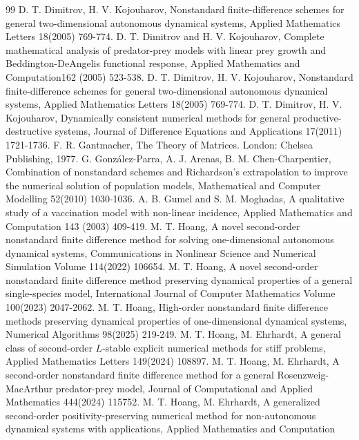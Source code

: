 \documentclass[12pt]{article}
\theoremstyle{definition}
\theoremstyle{remark}
\numberwithin{equation}{section}
\begin{document}
\begin{thebibliography}{99}
D. T. Dimitrov, H. V. Kojouharov, Nonstandard finite-difference schemes for general two-dimensional autonomous dynamical systems, Applied Mathematics Letters 18(2005) 769-774.
D. T. Dimitrov and H. V. Kojouharov,  {Complete mathematical analysis of predator-prey models with linear prey growth and Beddington-DeAngelis functional response}, Applied Mathematics and Computation{162} (2005) 523-538.
D. T. Dimitrov, H. V. Kojouharov, Nonstandard finite-difference schemes for general two-dimensional autonomous dynamical systems, Applied Mathematics Letters 18(2005) 769-774.
D. T. Dimitrov, H. V. Kojouharov, Dynamically consistent numerical methods for general productive-destructive systems, Journal of Difference Equations and Applications  17(2011)  1721-1736.
F. R. Gantmacher, The Theory of Matrices. London: Chelsea Publishing, 1977.
G. Gonz\'alez-Parra, A. J. Arenas,  B. M. Chen-Charpentier, Combination of nonstandard schemes and Richardson's extrapolation to improve the numerical solution of population models, Mathematical and Computer Modelling
52(2010) 1030-1036.
%
%
A. B. Gumel and S. M. Moghadas,  {A qualitative study of a vaccination model with non-linear incidence}, Applied Mathematics and Computation {143} (2003) 409-419.
M. T. Hoang, A novel second-order nonstandard finite difference method for solving one-dimensional autonomous dynamical systems, Communications in Nonlinear Science and Numerical Simulation Volume 114(2022) 106654.
%
M. T. Hoang, A novel second-order nonstandard finite difference method preserving dynamical properties of a general single-species model, International Journal of Computer Mathematics Volume 100(2023) 2047-2062.
%
M. T. Hoang, High-order nonstandard finite difference methods preserving dynamical properties of one-dimensional dynamical systems, Numerical Algorithms 98(2025) 219-249.
%
M. T. Hoang, M. Ehrhardt, A general class of second-order $L$-stable explicit numerical methods for stiff problems, Applied Mathematics Letters 149(2024) 108897.
%
M. T. Hoang, M. Ehrhardt, A second-order nonstandard finite difference method for a general Rosenzweig-MacArthur predator-prey model, Journal of Computational and Applied Mathematics 444(2024) 115752.
M. T. Hoang, M. Ehrhardt, A generalized second-order positivity-preserving numerical method for non-autonomous dynamical systems with applications, Applied Mathematics and Computation

\end{thebibliography}
\end{document}
